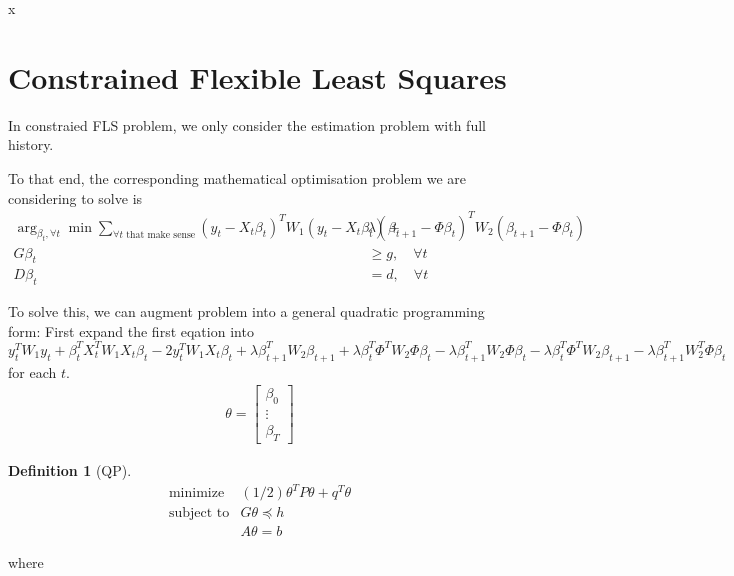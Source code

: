 \message{ !name(kalman_filter.tex)}x\documentclass{article}
\numberwithin{algorithm}{section}
\theoremstyle{plain}
\theoremstyle{definition}
\newtheorem{defn}[thm]{Definition}
\theoremstyle{remark}
\begin{document}
\section{Constrained Flexible Least Squares}
In constraied FLS problem, we only consider the estimation problem with full history.

To that end, the corresponding mathematical optimisation problem we are considering to solve is
\begin{equation}
\begin{split}
\arg_{\beta_t,\forall t}\min\sum_{\forall t \text{ that make sense}} (y_t - X_t \beta_t)^T W_1 (y_t - X_t \beta_t) +& \lambda (\beta_{t+1} - \Phi \beta_t)^T W_2 (\beta_{t+1} - \Phi \beta_t)\\
G \beta_t & \geq g, \quad \forall t\\
D \beta_t & = d, \quad \forall t
\end{split}
\end{equation}

To solve this, we can augment problem into a general quadratic programming form:
First expand the first eqation into
\[
y_t^T W_1 y_t + \beta_t^T X_t^T W_1 X_t \beta_t - 2 y_t^T W_1 X_t \beta_t + 
\lambda \beta_{t+1}^T W_2 \beta_{t+1} + \lambda \beta_t^T \Phi^T W_2 \Phi \beta_t -  \lambda \beta_{t+1}^T W_2 \Phi \beta_t -  \lambda \beta_{t}^T \Phi^T W_2  \beta_{t+1} -  \lambda \beta_{t+1}^T W^T_2\Phi   \beta_{t} 
\]
for each $t$.
\begin{equation}
\begin{split}
\theta = \left[
\begin{array}{c}
\beta_{0}\\
\vdots\\
\beta_{T}
\end{array}
\right]
\end{split}
\end{equation}

\begin{defn}[QP]
\begin{eqnarray*}
\mbox{minimize} & (1/2) \theta^TP\theta + q^T \theta \\
\mbox{subject to} & G\theta \preceq h \\ & A\theta = b
\end{eqnarray*}
\end{defn}
where
\end{document}
